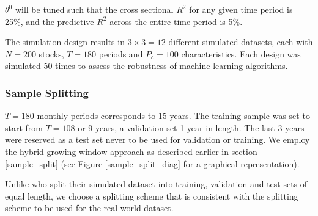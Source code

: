 \documentclass[a4paper, table]{article}
\newcommand{\smalltodo}[2][] {\todo[caption={#2}, size=\scriptsize,%
	fancyline,#1]{\begin{spacing}{.5}#2\end{spacing}}}
\newcommand{\rhs}[2][]{\smalltodo[color=green!30,#1]{{\bf RS:} #2}}
\begin{document}
$\theta^0$ will be tuned such that the cross sectional $R^2$ for any given time period is 25\%, and the predictive $R^2$ across the entire time period is 5\%.

\rhs{change this}

The simulation design results in $3 \times 3 = 12$ different simulated datasets, each with $N = 200$ stocks, $T = 180$ periods and $P_c = 100$ characteristics. Each design was simulated 50 times to assess the robustness of machine learning algorithms.

\subsubsection{Sample Splitting}

$T = 180$ monthly periods corresponds to 15 years. The training sample was set to start from $T = 108$ or 9 years, a validation set 1 year in length. The last 3 years were reserved as a test set never to be used for validation or training. We employ the hybrid growing window approach as described earlier in section \ref{sample_split} (see Figure \ref{sample_split_diag} for a graphical representation).

Unlike \cite{gu_empirical_2018} who split their simulated dataset into training, validation and test sets of equal length, we choose a splitting scheme that is consistent with the splitting scheme to be used for the real world dataset.
\end{document}
